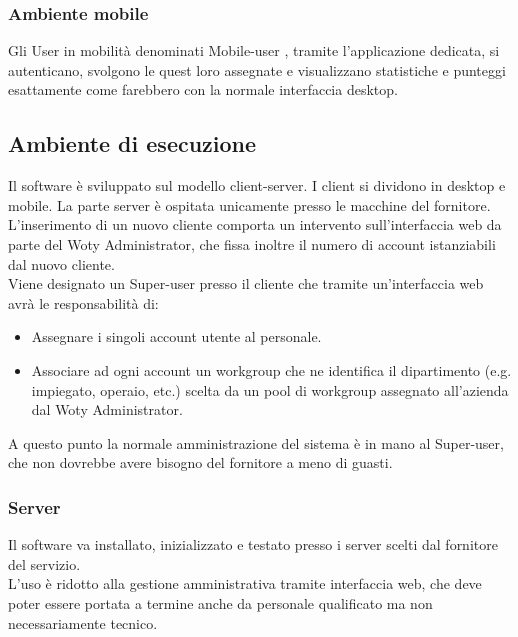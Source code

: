 \documentclass[10pt,a4paper]{article}
\begin{document}
\subsubsection{Ambiente mobile}
Gli User in mobilità denominati Mobile-user , tramite l’applicazione dedicata, si autenticano, svolgono le quest loro assegnate e visualizzano statistiche e punteggi esattamente come farebbero con la normale interfaccia desktop.

\subsection{Ambiente di esecuzione}

Il software è sviluppato sul modello client-server. I client si dividono in desktop e mobile. La parte server è ospitata unicamente presso le macchine del fornitore.\\
L’inserimento di un nuovo cliente comporta un intervento sull’interfaccia web da parte del Woty Administrator, che fissa inoltre il numero di account istanziabili dal nuovo cliente.\\
Viene designato un Super-user presso il cliente che tramite un’interfaccia web avrà le responsabilità di:
\begin{itemize}
\item{ Assegnare i singoli account utente al personale. }
\item{ Associare ad ogni account un workgroup che ne identifica il dipartimento (e.g. impiegato, operaio, etc.) scelta da un pool di workgroup assegnato all’azienda dal Woty Administrator. }
\end{itemize}

A questo punto la normale amministrazione del sistema è in mano al Super-user, che non dovrebbe avere bisogno del fornitore a meno di guasti.

\subsubsection{Server}
Il software va installato, inizializzato e testato presso i server scelti dal 	fornitore del servizio.\\
L’uso è ridotto alla gestione amministrativa tramite interfaccia web, che deve poter essere portata a termine anche da personale qualificato ma non necessariamente tecnico.\\

\newpage
\end{document}
